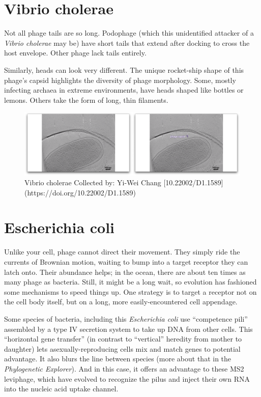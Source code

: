 \documentclass[]{tufte-book}
\begin{document}
\section{Vibrio cholerae}\label{vibrio-cholerae}

Not all phage tails are so long. Podophage (which this unidentified
attacker of a \emph{Vibrio cholerae} may be) have short tails that
extend after docking to cross the host envelope. Other phage lack tails
entirely.

Similarly, heads can look very different. The unique rocket-ship shape
of this phage's capsid highlights the diversity of phage morphology.
Some, mostly infecting archaea in extreme environments, have heads
shaped like bottles or lemons. Others take the form of long, thin
filaments.

\begin{figure}
\includegraphics{movie_stills/10_4} \caption[Vibrio cholerae Collected by]{Vibrio cholerae Collected by: Yi-Wei Chang [10.22002/D1.1589](https://doi.org/10.22002/D1.1589)}\label{fig:unnamed-chunk-176}
\end{figure}

\section{Escherichia coli}\label{escherichia-coli}

Unlike your cell, phage cannot direct their movement. They simply ride
the currents of Brownian motion, waiting to bump into a target receptor
they can latch onto. Their abundance helps; in the ocean, there are
about ten times as many phage as bacteria. Still, it might be a long
wait, so evolution has fashioned some mechanisms to speed things up. One
strategy is to target a receptor not on the cell body itself, but on a
long, more easily-encountered cell appendage.

Some species of bacteria, including this \emph{Escherichia coli} use
``competence pili'' assembled by a type IV secretion system to take up
DNA from other cells. This ``horizontal gene transfer'' (in contrast to
``vertical'' heredity from mother to daughter) lets
asexually-reproducing cells mix and match genes to potential advantage.
It also blurs the line between species (more about that in the
\emph{Phylogenetic Explorer}). And in this case, it offers an advantage
to these MS2 leviphage, which have evolved to recognize the pilus and
inject their own RNA into the nucleic acid uptake channel.
\end{document}
